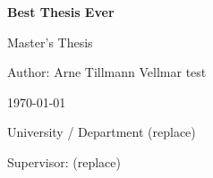 \begin{titlepage}
\centering
\vspace*{2cm}

{\LARGE\bfseries Best Thesis Ever\par}
\vspace{1.5cm}

{\large Master’s Thesis\par}
\vspace{1cm}

{\large Author: Arne Tillmann Vellmar test\par}
\vspace{0.5cm}

{\large \today\par}
\vfill

{\large University / Department (replace)\par}
\vspace{0.5cm}
{\large Supervisor: (replace)\par}

\end{titlepage}
